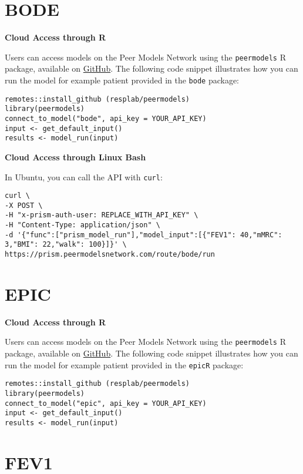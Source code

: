 \documentclass[
]{book}
\begin{document}
\hypertarget{bode-1}{%
\section{BODE}\label{bode-1}}

\textbf{Cloud Access through R}

Users can access models on the Peer Models Network using the \texttt{peermodels} R package, available on \href{https://github.com/resplab/peermodels}{GitHub}. The following code snippet illustrates how you can run the model for example patient provided in the \texttt{bode} package:

\begin{verbatim}
remotes::install_github (resplab/peermodels)
library(peermodels)
connect_to_model("bode", api_key = YOUR_API_KEY)
input <- get_default_input()
results <- model_run(input)
\end{verbatim}

\textbf{Cloud Access through Linux Bash}

In Ubuntu, you can call the API with \texttt{curl}:

\begin{verbatim}
curl \
-X POST \
-H "x-prism-auth-user: REPLACE_WITH_API_KEY" \
-H "Content-Type: application/json" \
-d '{"func":["prism_model_run"],"model_input":[{"FEV1": 40,"mMRC": 3,"BMI": 22,"walk": 100}]}' \
https://prism.peermodelsnetwork.com/route/bode/run
\end{verbatim}

\hypertarget{epic-1}{%
\section{EPIC}\label{epic-1}}

\textbf{Cloud Access through R}

Users can access models on the Peer Models Network using the \texttt{peermodels} R package, available on \href{https://github.com/resplab/peermodels}{GitHub}. The following code snippet illustrates how you can run the model for example patient provided in the \texttt{epicR} package:

\begin{verbatim}
remotes::install_github (resplab/peermodels)
library(peermodels)
connect_to_model("epic", api_key = YOUR_API_KEY)
input <- get_default_input()
results <- model_run(input)
\end{verbatim}

\hypertarget{fev1-1}{%
\section{FEV1}\label{fev1-1}}
\end{document}
